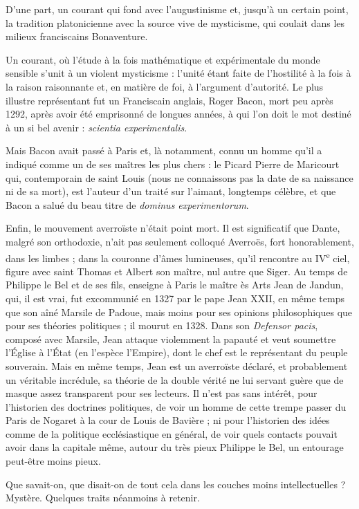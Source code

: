 \documentclass[french,twoside]{book} %
\begin{document}
\begin{listalpha}[itemsep=\baselineskip,]
\item D’une part, un courant qui fond avec l’augustinisme et, jusqu’à un certain point, la tradition platonicienne avec la source vive de mysticisme, qui coulait dans les milieux franciscains Bonaventure.
\item Un courant, où l’étude à la fois mathématique et expérimentale du monde sensible s’unit à un violent mysticisme : l’unité étant faite de l’hostilité à la fois à la raison raisonnante et, en matière de foi, à l’argument d’autorité. Le plus illustre représentant fut un Franciscain anglais, Roger Bacon, mort peu après 1292, après avoir été emprisonné de longues années, à qui l’on doit le mot destiné à un si bel avenir : \emph{scientia experimentalis}.\par
Mais Bacon avait passé à Paris et, là notamment, connu un homme qu’il a indiqué comme un de ses maîtres les plus chers : le Picard Pierre de Maricourt qui, contemporain de saint Louis (nous ne connaissons pas la date de sa naissance ni de sa mort), est l’auteur d’un traité sur l’aimant, longtemps célèbre, et que Bacon a salué du beau titre de \emph{dominus experimentorum}.

\item Enfin, le mouvement averroïste n’était point mort. Il est significatif que Dante, malgré son orthodoxie, n’ait pas seulement colloqué Averroës, fort honorablement, dans les limbes ; dans la couronne d’âmes lumineuses, qu’il rencontre au IV\textsuperscript{e} ciel, figure avec saint Thomas et Albert son maître, nul autre que Siger. Au temps de Philippe le Bel et de ses fils, enseigne à Paris le maître ès Arts Jean de Jandun, qui, il est vrai, fut excommunié en 1327 par le pape Jean XXII, en même temps que son aîné Marsile de Padoue, mais moins pour ses opinions philosophiques que pour ses théories politiques ; il mourut en 1328. Dans son {\itshape Defensor pacis}, composé avec Marsile, Jean attaque violemment la papauté et veut soumettre l’Église à l’État (en l’espèce l’Empire), dont le chef est le représentant du peuple souverain. Mais en même temps, Jean est un averroïste déclaré, et probablement un véritable incrédule, sa théorie de la double vérité ne lui servant guère que de masque assez transparent pour ses lecteurs. Il n’est pas sans intérêt, pour l’historien des doctrines politiques, de voir un homme de cette trempe passer du Paris de Nogaret à la cour de Louis de Bavière ; ni pour l’historien des idées comme de la politique ecclésiastique en général, de voir quels contacts pouvait avoir dans la capitale même, autour du très pieux Philippe le Bel, un entourage peut-être moins pieux.

\end{listalpha}\noindent Que savait-on, que disait-on de tout cela dans les couches moins intellectuelles ? Mystère. Quelques traits néanmoins à retenir.\par
\end{document}
